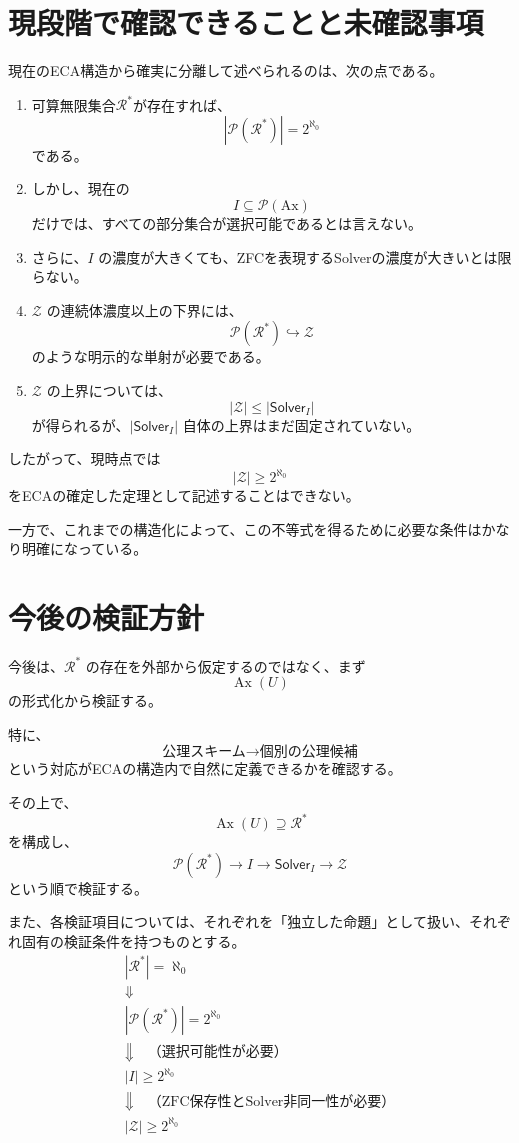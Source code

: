 \documentclass[a4paper,11pt]{article}
\newcommand{\Ax}{\mathrm{Ax}}
\newcommand{\Solver}{\mathsf{Solver}}
\begin{document}
\section{現段階で確認できることと未確認事項}

現在のECA構造から確実に分離して述べられるのは、次の点である。
\begin{enumerate}
  \item 可算無限集合\(\mathcal{R}^*\)が存在すれば、
  \[
  |\mathcal{P}(\mathcal{R}^*)|=2^{\aleph_0}
  \]
  である。

  \item しかし、現在の
  \[
  I\subseteq\mathcal{P}(\Ax)
  \]
  だけでは、すべての部分集合が選択可能であるとは言えない。

  \item さらに、\(I\) の濃度が大きくても、ZFCを表現するSolverの濃度が大きいとは限らない。

  \item \(\mathcal{Z}\) の連続体濃度以上の下界には、
  \[
  \mathcal{P}(\mathcal{R}^*)\hookrightarrow\mathcal{Z}
  \]
  のような明示的な単射が必要である。

  \item \(\mathcal{Z}\) の上界については、
  \[
  |\mathcal{Z}|\le|\Solver_I|
  \]
  が得られるが、\(|\Solver_I|\) 自体の上界はまだ固定されていない。
\end{enumerate}

したがって、現時点では
\[
|\mathcal{Z}|\ge2^{\aleph_0}
\]
をECAの確定した定理として記述することはできない。

一方で、これまでの構造化によって、この不等式を得るために必要な条件はかなり明確になっている。

\section{今後の検証方針}

今後は、\(\mathcal{R}^*\) の存在を外部から仮定するのではなく、まず
\[
\operatorname{Ax}(U)
\]
の形式化から検証する。

特に、
\[
\boxed{
\text{公理スキーム}
\longrightarrow
\text{個別の公理候補}
}
\]
という対応がECAの構造内で自然に定義できるかを確認する。

その上で、
\[
\operatorname{Ax}(U)
\supseteq
\mathcal{R}^*
\]
を構成し、
\[
\mathcal{P}(\mathcal{R}^*)
\longrightarrow
I
\longrightarrow
\Solver_I
\longrightarrow
\mathcal{Z}
\]
という順で検証する。

また、各検証項目については、それぞれを「独立した命題」として扱い、それぞれ固有の検証条件を持つものとする。
\[
\boxed{
\begin{array}{c}
|\mathcal{R}^*|=\aleph_0\\[2mm]
\Downarrow\\
|\mathcal{P}(\mathcal{R}^*)|=2^{\aleph_0}\\[2mm]
\Downarrow\quad\text{（選択可能性が必要）}\\
|I|\ge2^{\aleph_0}\\[2mm]
\Downarrow\quad\text{（ZFC保存性とSolver非同一性が必要）}\\
|\mathcal{Z}|\ge2^{\aleph_0}
\end{array}
}
\]
\end{document}
